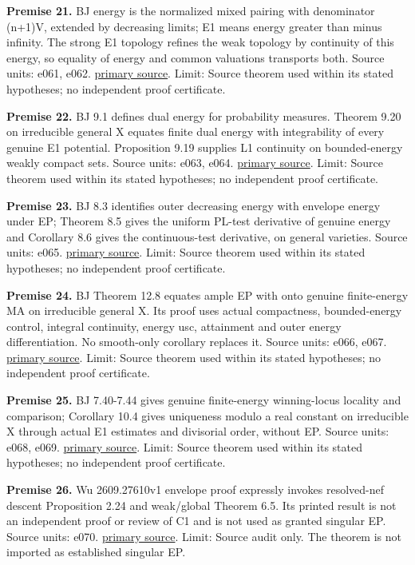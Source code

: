 \documentclass[
  10pt,
]{article}
\begin{document}
\textbf{Premise 21.} BJ energy is the normalized mixed pairing with
denominator (n+1)V, extended by decreasing limits; E1 means energy
greater than minus infinity. The strong E1 topology refines the weak
topology by continuity of this energy, so equality of energy and common
valuations transports both. Source units: e061, e062.
\href{https://arxiv.org/pdf/1801.08229v4}{primary source}. Limit: Source
theorem used within its stated hypotheses; no independent proof
certificate.

\textbf{Premise 22.} BJ 9.1 defines dual energy for probability
measures. Theorem 9.20 on irreducible general X equates finite dual
energy with integrability of every genuine E1 potential. Proposition
9.19 supplies L1 continuity on bounded-energy weakly compact sets.
Source units: e063, e064.
\href{https://arxiv.org/pdf/1801.08229v4}{primary source}. Limit: Source
theorem used within its stated hypotheses; no independent proof
certificate.

\textbf{Premise 23.} BJ 8.3 identifies outer decreasing energy with
envelope energy under EP; Theorem 8.5 gives the uniform PL-test
derivative of genuine energy and Corollary 8.6 gives the continuous-test
derivative, on general varieties. Source units: e065.
\href{https://arxiv.org/pdf/1801.08229v4}{primary source}. Limit: Source
theorem used within its stated hypotheses; no independent proof
certificate.

\textbf{Premise 24.} BJ Theorem 12.8 equates ample EP with onto genuine
finite-energy MA on irreducible general X. Its proof uses actual
compactness, bounded-energy control, integral continuity, energy usc,
attainment and outer energy differentiation. No smooth-only corollary
replaces it. Source units: e066, e067.
\href{https://arxiv.org/pdf/1801.08229v4}{primary source}. Limit: Source
theorem used within its stated hypotheses; no independent proof
certificate.

\textbf{Premise 25.} BJ 7.40-7.44 gives genuine finite-energy
winning-locus locality and comparison; Corollary 10.4 gives uniqueness
modulo a real constant on irreducible X through actual E1 estimates and
divisorial order, without EP. Source units: e068, e069.
\href{https://arxiv.org/pdf/1801.08229v4}{primary source}. Limit: Source
theorem used within its stated hypotheses; no independent proof
certificate.

\textbf{Premise 26.} Wu 2609.27610v1 envelope proof expressly invokes
resolved-nef descent Proposition 2.24 and weak/global Theorem 6.5. Its
printed result is not an independent proof or review of C1 and is not
used as granted singular EP. Source units: e070.
\href{https://arxiv.org/pdf/2609.27610v1}{primary source}. Limit: Source
audit only. The theorem is not imported as established singular EP.
\end{document}
